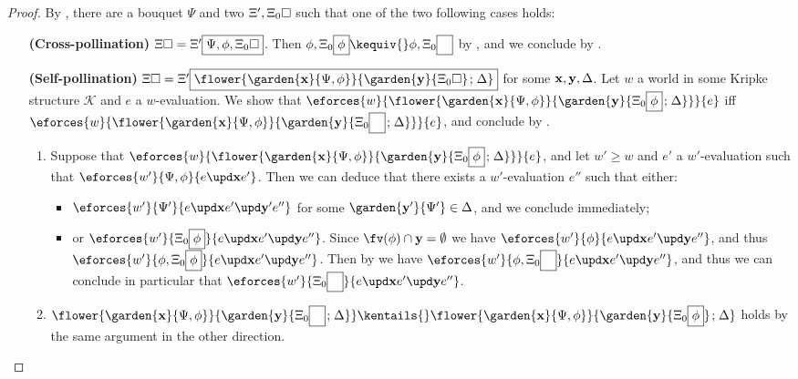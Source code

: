 \begin{scope}
\begin{proof}
  By , there are a bouquet $\Psi$ and two  $\Xi',
  \Xi_0\square$ such that one of the two following cases holds:
  \begin{itemize}
    \item[\textbf{(Cross-pollination)}] $\Xi\square = \Xi'\fbox{$\Psi, \phi,
    \Xi_0\square$}$. Then $\phi, \Xi_0\select{\phi} \kequiv{} \phi,
    \Xi_0\select{\phantom\phi}$ by , and we
    conclude by .
    \item[\textbf{(Self-pollination)}] $\Xi\hole =
    \Xi'\select{\flower{\garden{\bx}{\Psi,
    \phi}}{\garden{\by}{\Xi_0\hole} \sep \Delta}}$ for some
    $\mathbf{x},\mathbf{y},\Delta$. Let $w$ a world in some Kripke
    structure $\mathcal{K}$ and $e$ a $w$-evaluation. We show that
    $\eforces{w}{\flower{\garden{\bx}{\Psi,
    \phi}}{\garden{\by}{\Xi_0\select{\phi} \sep \Delta}}}{e}$ iff
    $\eforces{w}{\flower{\garden{\bx}{\Psi,
    \phi}}{\garden{\by}{\Xi_0\select{\phantom{\phi}} \sep \Delta}}}{e}$,
    and conclude by .
    \begin{enumerate}
      \item Suppose that $\eforces{w}{\flower{\garden{\bx}{\Psi,
      \phi}}{\garden{\by}{\Xi_0\select{\phi} \sep \Delta}}}{e}$, and let
      $w' \geq w$ and $e'$ a $w'$-evaluation such that $\eforces{w'}{\Psi,
      \phi}{\update{e}{\bx}{e'}}$. Then we can deduce that there exists a
      $w'$-evaluation $e''$ such that either:
      \begin{itemize}
        \item
        $\eforces{w'}{\Psi'}{\update{e}{\bx}{\update{e'}{\mathbf{y'}}{e''}}}$
        for some $\garden{\mathbf{y'}}{\Psi'} \in \Delta$, and we conclude
        immediately;
        \item
        or
        $\eforces{w'}{\Xi_0\select{\phi}}{\update{e}{\bx}{\update{e'}{\by}{e''}}}$.
        Since $\fv(\phi) \cap \by = \emptyset$ we have
        $\eforces{w'}{\phi}{\update{e}{\bx}{\update{e'}{\by}{e''}}}$,
        and thus $\eforces{w'}{\phi,
        \Xi_0\select{\phi}}{\update{e}{\bx}{\update{e'}{\by}{e''}}}$.
        Then by  we have $\eforces{w'}{\phi,
        \Xi_0\select{\phantom{\phi}}}{\update{e}{\bx}{\update{e'}{\by}{e''}}}$,
        and thus we can conclude in particular that
        $\eforces{w'}{\Xi_0\select{\phantom{\phi}}}{\update{e}{\bx}{\update{e'}{\by}{e''}}}$.
      \end{itemize}
    \item $\flower{\garden{\bx}{\Psi,
    \phi}}{\garden{\by}{\Xi_0\select{\phantom{\phi}} \sep \Delta}}
    \kentails{}\flower{\garden{\bx}{\Psi,
    \phi}}{\garden{\by}{\Xi_0\select{\phi}} \sep \Delta}$ holds by the same
    argument in the other direction.
    \end{enumerate}
  \end{itemize}
\end{proof}


\end{scope}
